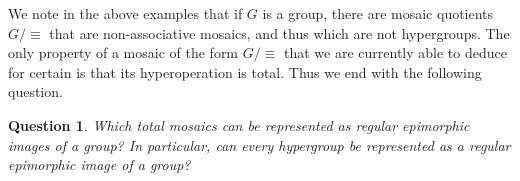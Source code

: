 \documentclass[reqno]{amsart}
\numberwithin{equation}{section}
\theoremstyle{plain}
\newtheorem{question}[equation]{Question}
\theoremstyle{definition}
\begin{document}
We note in the above examples that if $G$ is a group, there are mosaic quotients $G/\!\!\equiv$ that are non-associative mosaics, and thus which are not hypergroups. The only property of a mosaic of the form $G/\!\!\equiv$ that we are currently able to deduce for certain is that its hyperoperation is total. Thus we end with the following question.

\begin{question}
    Which total mosaics can be represented as regular epimorphic images of a group? In particular, can every hypergroup be represented as a regular epimorphic image of a group?
\end{question}




\end{document}
